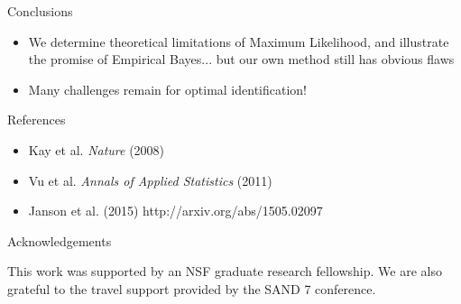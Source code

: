 \documentclass[final]{beamer}
\newlength{\onecolwid}
\begin{document}
\begin{frame}[t]
\begin{columns}[t]
\begin{column}{\onecolwid}
\begin{block}{Conclusions}
\begin{itemize}
\item We determine theoretical limitations of Maximum Likelihood, and
  illustrate the promise of Empirical Bayes... but our own method
  still has obvious flaws
\item Many challenges remain for optimal identification!
\end{itemize}
\end{block}


\begin{block}{References}


\small{
\begin{itemize}
\item Kay et al. \emph{Nature} (2008)
\item Vu et al. \emph{Annals of Applied Statistics} (2011)
\item Janson et al. (2015) http://arxiv.org/abs/1505.02097
\end{itemize}
}

\end{block}


\begin{block}{Acknowledgements}


\small{ This work was supported by an NSF graduate research fellowship.
  We are also grateful to the travel support provided by the SAND 7 conference.  }

\end{block}





\end{column} %

\end{columns} %

\end{frame} %
\end{document}
